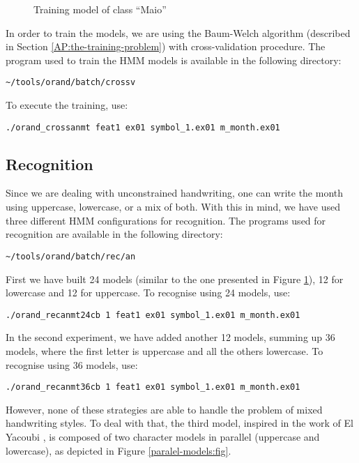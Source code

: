 \documentclass{article}[14pt, oneside, a4paper, times]
\begin{document}
\begin{figure}[htbp]
   \centering
   \caption{Training model of class ``Maio''}
   \label{training-model:fig}
\end{figure}
 
In order to train the models, we are using the Baum-Welch algorithm (described in Section \ref{AP:the-training-problem}) with cross-validation procedure. The program used to train the HMM models is available in the following directory:

\begin{verbatim}
~/tools/orand/batch/crossv
\end{verbatim}

To execute the training, use:
\begin{verbatim}
./orand_crossanmt feat1 ex01 symbol_1.ex01 m_month.ex01
\end{verbatim}
 
\subsection{Recognition}

Since we are dealing with unconstrained handwriting, one can write the month using uppercase, lowercase, or a mix of both. With this in mind, we have used three different HMM configurations for recognition. The programs used for recognition are available in the following directory:

\begin{verbatim}
~/tools/orand/batch/rec/an
\end{verbatim}


First we have built 24 models (similar to the one presented in Figure \ref{training-model:fig}), 12 for lowercase and 12 for uppercase. To recognise using 24 models, use:
\begin{verbatim}
./orand_recanmt24cb 1 feat1 ex01 symbol_1.ex01 m_month.ex01
\end{verbatim}

In the second experiment, we have added another 12 models, summing up 36 models, where the first letter is uppercase and all the others lowercase. To recognise using 36 models, use:
\begin{verbatim}
./orand_recanmt36cb 1 feat1 ex01 symbol_1.ex01 m_month.ex01
\end{verbatim}

However, none of these strategies are able to handle the problem of mixed handwriting styles. To deal with that, the third model, inspired in the work of El Yacoubi \cite{El99}, is composed of two character models in parallel (uppercase and lowercase), as depicted in Figure \ref{paralel-models:fig}.
\end{document}
